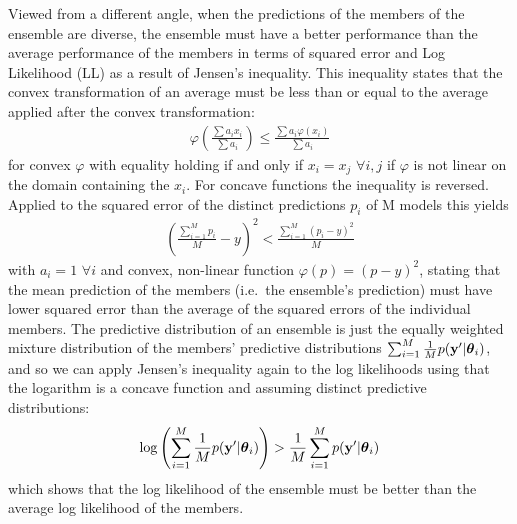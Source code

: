 \documentclass[../thesis.tex]{subfiles}
\begin{document}
Viewed from a different angle, when the predictions of the members of the ensemble are diverse, the ensemble must have a better performance than the average performance of the members in terms of squared error and Log Likelihood (LL) as a result of Jensen's inequality. This inequality states that the convex transformation of an average must be less than or equal to the average applied after the convex transformation:
\begin{equation}
    \begin{split}
        \varphi\left(\frac{\sum a_i x_i} {\sum a_i}\right) \le \frac{\sum a_i\varphi(x_i)}{\sum a_i} 
    \end{split}
\end{equation}
for convex $\varphi$ with equality holding if and only if $x_i=x_j$ $\forall i, j$ if $\varphi$ is not linear on the domain containing the $x_i$. For concave functions the inequality is reversed. Applied to the squared error of the distinct predictions $p_i$ of M models this yields
\begin{equation}
    \begin{split}
        \left(\frac{\sum_{i=1}^M p_i}{M} - y\right)^2  < \frac{\sum_{i=1}^M (p_i - y)^2}{M}
    \end{split}
\end{equation}
with $a_i=1$ $\forall i$ and convex, non-linear function $\varphi(p) = (p-y)^2$, stating that the mean prediction of the members (i.e.\ the ensemble's prediction) must have lower squared error than the average of the squared errors of the individual members. 
The predictive distribution of an ensemble is just the equally weighted mixture distribution of the members' predictive distributions $\sum_{i=1}^M \frac{1}{M} p(\boldsymbol{\mathbf{y}}' | \boldsymbol{\mathbf{\theta}}_i)$, and so we can apply Jensen's inequality again to the log likelihoods using that the logarithm is a concave function and assuming distinct predictive distributions:
\begin{equation}
    \begin{split}
        \log\left(\sum_{i=1}^M \frac{1}{M} p(\boldsymbol{\mathbf{y}}' | \boldsymbol{\mathbf{\theta}}_i)\right)  >  \frac{1}{M} \sum_{i=1}^M p(\boldsymbol{\mathbf{y}}' | \boldsymbol{\mathbf{\theta}}_i)
    \end{split}
\end{equation}
which shows that the log likelihood of the ensemble must be better than the average log likelihood of the members.

\end{document}
